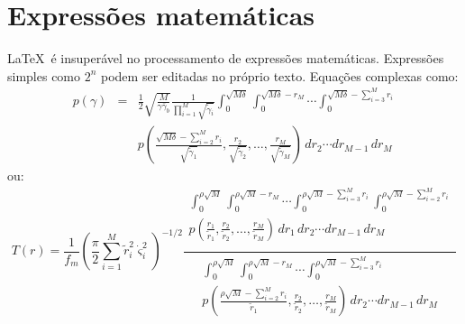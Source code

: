 \section{Expressões matemáticas}
\label{Sec:expressoesMatematicas}

\LaTeX~é insuperável no processamento de expressões matemáticas. Expressões
simples como $2^{n}$ podem ser editadas no próprio texto. Equações
complexas como:
\begin{eqnarray} \label{eq:PDF:RSR}
  p \left( \gamma \right) & = & \frac{1}{2} \sqrt{\frac{M}{\gamma \bar{\gamma}_{b}}} \frac{1}{ \prod_{i=1}^M {\sqrt{\tilde{\gamma}_i}}}
  \int_0^{\sqrt{M \delta}} \int_0^{\sqrt{M \delta} - r_M } \cdots
  \int_0^{\sqrt{M \delta} - \sum_{i = 3}^M {r_i } } \nonumber \\
  & & p \left( {\frac{\sqrt{M \delta} - \sum_{i = 2}^M {r_i }}{\sqrt{\tilde{\gamma}_1}} ,
  \frac{r_2}{\sqrt{\tilde{\gamma}_2}} , \ldots ,\frac{r_M}{\sqrt{\tilde{\gamma}_M}} } \right)
  \, dr_2 \cdots dr_{M-1} \, dr_M
\end{eqnarray}
ou:
\begin{equation} \label{eq:TrCGI}
  T(r) = \frac{1}{f_m}
  \left( \frac{\pi}{2} \sum_{i=1}^M
  {\tilde{r}_i^2 \dot{\varsigma}_i^2}\right)^{-1/2}
  \frac
  {\begin{array}{ll}
  \int_0^{\rho \sqrt{M}} \int_0^{\rho \sqrt{M} - r_M } \cdots
  \int_0^{\rho \sqrt{M} - \sum_{i = 3}^M {r_i } } \int_0^{\rho \sqrt{M} -
  \sum_{i = 2}^M {r_i } }  \\
  p \left( {\frac{r_1}{\tilde{r}_1} ,
  \frac{r_2}{\tilde{r}_2} , \ldots ,\frac{r_M}{\tilde{r}_M} } \right)
  \, dr_1 \, dr_2 \cdots dr_{M-1} \, dr_M \\ \end{array}}
  {\begin{array}{ll}
  \int_0^{\rho \sqrt{M}} \int_0^{\rho \sqrt{M} - r_M } \cdots
  \int_0^{\rho \sqrt{M} - \sum_{i = 3}^M {r_i } } \\
  p \left( {\frac{\rho \sqrt{M} - \sum_{i = 2}^M {r_i }}{\tilde{r}_1} ,
  \frac{r_2}{\tilde{r}_2} , \ldots ,\frac{r_M}{\tilde{r}_M} } \right)
  \, dr_2 \cdots dr_{M-1} \, dr_M \\ \end{array}}
\end{equation}

